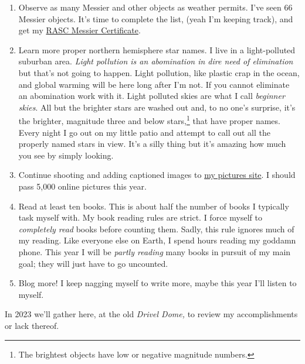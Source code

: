\begin{enumerate}
\item
  Observe as many Messier and other objects as weather permits. I've
  seen 66 Messier objects. It's time to complete the list, (yeah I'm
  keeping track), and get my
  \href{https://www.rasc.ca/observing/messier-certificate}{RASC Messier
  Certificate}.
\item
  Learn more proper northern hemisphere star names. I live in a
  light-polluted suburban area. \emph{Light pollution is an abomination
  in dire need of elimination} but that's not going to happen. Light
  pollution, like plastic crap in the ocean, and global warming will be
  here long after I'm not. If you cannot eliminate an abomination work
  with it. Light polluted skies are what I call \emph{beginner skies}.
  All but the brighter stars are washed out and, to no one's surprise,
  it's the brighter, magnitude three and below stars,\footnote{The brightest objects 
have low or negative magnitude  numbers.
} that have proper
  names. Every night I go out on my little patio and attempt to call out
  all the properly named stars in view. It's a silly thing but it's
  amazing how much you see by simply looking.
\item
  Continue shooting and adding captioned images to
  \href{https://conceptcontrol.smugmug.com/}{my pictures site}. I should
  pass 5,000 online pictures this year.
\item
  Read at least ten books. This is about half the number of books I
  typically task myself with. My book reading rules are strict. I force
  myself to \emph{completely read} books before counting them. Sadly,
  this rule ignores much of my reading. Like everyone else on Earth, I
  spend hours reading my goddamn phone. This year I will be \emph{partly
  reading} many books in pursuit of my main goal; they will just have to
  go uncounted.
\item
  Blog more! I keep nagging myself to write more, maybe this year I'll
  listen to myself.
\end{enumerate}

In 2023 we'll gather here, at the old \emph{Drivel Dome,} to review my
accomplishments or lack thereof.



%

